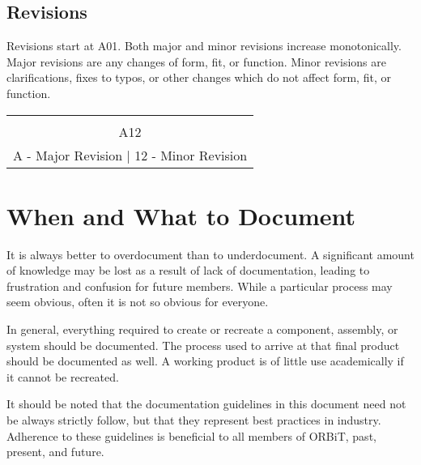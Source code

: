 \documentclass[12pt,article]{memoir}
\begin{document}
\section{Revisions}
Revisions start at A01. Both major and minor revisions increase monotonically. Major revisions are any changes of form, fit, or function. Minor revisions are clarifications, fixes to typos, or other changes which do not affect form, fit, or function.
\begin{table}[h]
	\centering
	\begin{tabu}{|c|}
		\hline\\
		\huge \colorbox{shadecolor1}{A}\colorbox{shadecolor2}{12}\\
		\colorbox{shadecolor1}{A} - Major Revision | \colorbox{shadecolor2}{12} - Minor Revision\\ \hline
	\end{tabu}
\end{table}

\newpage

\chapter{When and What to Document}
It is always better to overdocument than to underdocument. A significant amount of knowledge may be lost as a result of lack of documentation, leading to frustration and confusion for future members. While a particular process may seem obvious, often it is not so obvious for everyone.\par
In general, everything required to create or recreate a component, assembly, or system should be documented. The process used to arrive at that final product should be documented as well. A working product is of little use academically if it cannot be recreated.\par
It should be noted that the documentation guidelines in this document need not be always strictly follow, but that they represent best practices in industry. Adherence to these guidelines is beneficial to all members of ORBiT, past, present, and future.

\end{document}
